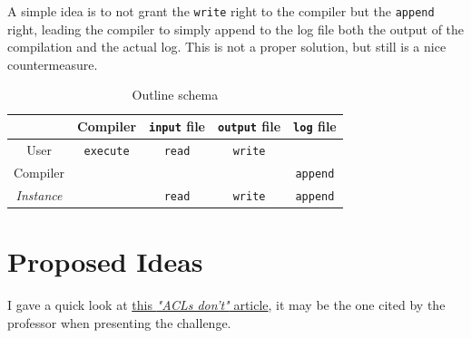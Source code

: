 A simple idea is to not grant the \texttt{write} right to the compiler but the \texttt{append} right,
leading the compiler to simply append to the log file both the output of the compilation and the actual log.
This is not a proper solution, but still is a nice countermeasure.

\begin{table}[htbp]
   \centering
   \begin{tabular}{c|c|c|c|c|}
      & Compiler & \texttt{input} file & \texttt{output} file &\texttt{log} file\\
      \hline
      User & \texttt{execute} & \texttt{read} & \texttt{write} &\\
      \hline
      Compiler & & & & \texttt{append}\\
      \hline
      \textit{Instance} & & \texttt{read} & \texttt{write} & \texttt{append}\\
   \end{tabular}
   \caption{Outline schema}
   \label{tab:ch3_inclass}
\end{table}


\newpage

\section{Proposed Ideas}
I gave a quick look at \href{https://waterken.sourceforge.net/aclsdont/current.pdf}{this \textit{"ACLs don't"} article}, it may be the one cited by the professor when presenting the challenge.

